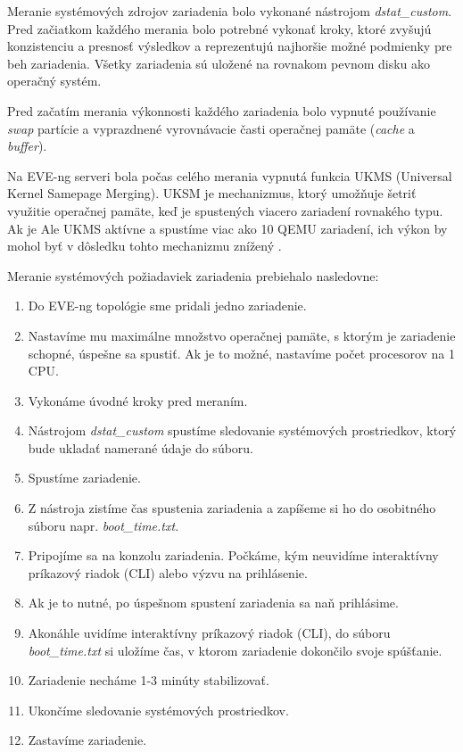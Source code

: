 Meranie systémových zdrojov zariadenia bolo vykonané nástrojom \emph{dstat\_custom}. Pred začiatkom každého merania bolo potrebné vykonať kroky, ktoré zvyšujú konzistenciu a presnosť výsledkov a reprezentujú najhoršie možné podmienky pre beh zariadenia. Všetky zariadenia sú uložené na rovnakom pevnom disku ako operačný systém.

Pred začatím merania výkonnosti každého zariadenia bolo vypnuté používanie \emph{swap} partície a vyprazdnené vyrovnávacie časti operačnej pamäte (\emph{cache} a \emph{buffer}).

Na EVE-ng serveri bola počas celého merania vypnutá funkcia UKMS (Universal Kernel Samepage Merging). UKSM je mechanizmus, ktorý umožňuje šetriť využitie operačnej pamäte, keď je spustených viacero zariadení rovnakého typu. Ak je Ale UKMS aktívne a spustíme viac ako 10 QEMU zariadení, ich výkon by mohol byť v dôsledku tohto mechanizmu znížený \cite{eve_ng_faq}.

\noindent
Meranie systémových požiadaviek zariadenia prebiehalo nasledovne:

\begin{enumerate}[noitemsep]
    \item Do EVE-ng topológie sme pridali jedno zariadenie.
    \item \label{nastavenie_sys_param} Nastavíme mu maximálne množstvo operačnej pamäte, s ktorým je zariadenie schopné, úspešne sa spustiť. Ak je to možné, nastavíme počet procesorov na 1 CPU.
    \item Vykonáme úvodné kroky pred meraním.
    \item Nástrojom \emph{dstat\_custom} spustíme sledovanie systémových prostriedkov, ktorý bude ukladať namerané údaje do súboru.
    \item Spustíme zariadenie.
    \item Z nástroja zistíme čas spustenia zariadenia a zapíšeme si ho do osobitného súboru napr. \emph{boot\_time.txt}.
    \item Pripojíme sa na konzolu zariadenia. Počkáme, kým neuvidíme interaktívny príkazový riadok (CLI) alebo výzvu na prihlásenie.
    \item Ak je to nutné, po úspešnom spustení zariadenia sa naň prihlásime.
    \item Akonáhle uvidíme interaktívny príkazový riadok (CLI), do súboru \emph{boot\_time.txt} si uložíme čas, v ktorom zariadenie dokončilo svoje spúšťanie. 
    \item Zariadenie necháme 1-3 minúty stabilizovať.
    \item Ukončíme sledovanie systémových prostriedkov.
    \item Zastavíme zariadenie.
\end{enumerate}

